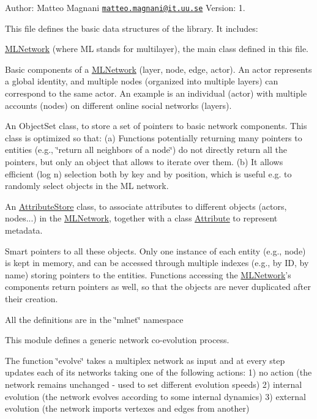 Author\+: Matteo Magnani \href{mailto:matteo.magnani@it.uu.se}{\tt matteo.\+magnani@it.\+uu.\+se} Version\+: 1.

This file defines the basic data structures of the library. It includes\+:


\begin{DoxyEnumerate}
\item \hyperlink{classmlnet_1_1_m_l_network}{M\+L\+Network} (where M\+L stands for multilayer), the main class defined in this file.
\item Basic components of a \hyperlink{classmlnet_1_1_m_l_network}{M\+L\+Network} (layer, node, edge, actor). An actor represents a global identity, and multiple nodes (organized into multiple layers) can correspond to the same actor. An example is an individual (actor) with multiple accounts (nodes) on different online social networks (layers).
\item An Object\+Set class, to store a set of pointers to basic network components. This class is optimized so that\+: (a) Functions potentially returning many pointers to entities (e.\+g., \char`\"{}return all neighbors of a node\char`\"{}) do not directly return all the pointers, but only an object that allows to iterate over them. (b) It allows efficient (log n) selection both by key and by position, which is useful e.\+g. to randomly select objects in the M\+L network.
\item An \hyperlink{classmlnet_1_1_attribute_store}{Attribute\+Store} class, to associate attributes to different objects (actors, nodes...) in the \hyperlink{classmlnet_1_1_m_l_network}{M\+L\+Network}, together with a class \hyperlink{classmlnet_1_1_attribute}{Attribute} to represent metadata.
\item Smart pointers to all these objects. Only one instance of each entity (e.\+g., node) is kept in memory, and can be accessed through multiple indexes (e.\+g., by I\+D, by name) storing pointers to the entities. Functions accessing the \hyperlink{classmlnet_1_1_m_l_network}{M\+L\+Network}'s components return pointers as well, so that the objects are never duplicated after their creation.
\end{DoxyEnumerate}

All the definitions are in the \char`\"{}mlnet\char`\"{} namespace

This module defines a generic network co-\/evolution process.

The function \char`\"{}evolve\char`\"{} takes a multiplex network as input and at every step updates each of its networks taking one of the following actions\+: 1) no action (the network remains unchanged -\/ used to set different evolution speeds) 2) internal evolution (the network evolves according to some internal dynamics) 3) external evolution (the network imports vertexes and edges from another) 

